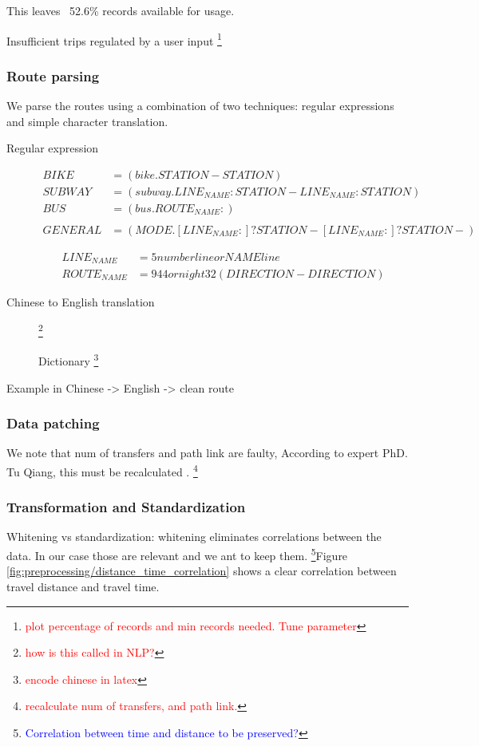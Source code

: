 \documentclass{article}
\newcommand{\selfnote}[1]{\footnote{\textcolor{red}{#1}}}
\newcommand{\technicalDoubt}[1]{\footnote{\textcolor{blue}{#1}}}
\begin{document}
This leaves ~52.6\% records available for usage. 

Insufficient trips regulated by a user input \selfnote{plot percentage of records and min records needed. Tune parameter}

\subsubsection{Route parsing} 
\label{sec:route}
We parse the routes using a combination of two techniques: regular expressions and simple character translation. 

\begin{description}
\item [Regular expression]
    \begin{align*}
    BIKE &= (bike.STATION-STATION) \\
    SUBWAY &= (subway.LINE_{NAME}:STATION-LINE_{NAME}:STATION) \\
    BUS &= (bus.ROUTE_{NAME}:) \\ \\
    GENERAL &= (MODE.[LINE_{NAME}:]? STATION-[LINE_{NAME}:]? STATION-) 
	\end{align*}    
    
    \begin{align*}
    LINE_{NAME} &=      5 number line or NAME line \\
    ROUTE_{NAME} &=      944 or night 32 (DIRECTION - DIRECTION)
    \end{align*}

\item [Chinese to English translation]
\selfnote{how is this called in NLP?}

Dictionary \selfnote{encode chinese in latex}

\end{description}

Example in Chinese -> English -> clean route



\subsubsection{Data patching}
We note that num of transfers and path link are faulty, According to expert PhD. Tu Qiang, this must be recalculated \cite{tommy}.
\selfnote{recalculate num of transfers, and path link.}


\subsubsection{Transformation and Standardization}
Whitening vs standardization: whitening eliminates correlations between the data. In our case those are relevant and we ant to keep them. \technicalDoubt{Correlation between time and distance to be preserved?}Figure \ref{fig:preprocessing/distance_time_correlation} shows a clear correlation between travel distance and travel time. 
\end{document}
